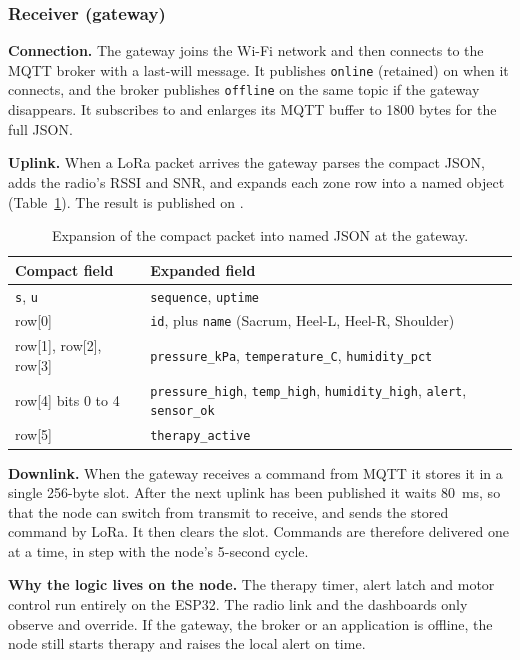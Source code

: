 \subsubsection{Receiver (gateway)}
\textbf{Connection.} The gateway joins the Wi-Fi network and then connects to the MQTT broker with a last-will message. It publishes \texttt{online} (retained) on  when it connects, and the broker publishes \texttt{offline} on the same topic if the gateway disappears. It subscribes to  and enlarges its MQTT buffer to 1800 bytes for the full JSON.

\textbf{Uplink.} When a LoRa packet arrives the gateway parses the compact JSON, adds the radio's RSSI and SNR, and expands each zone row into a named object (Table~\ref{tab:expand}). The result is published on .

{\small{}
\begin{table}[H]
\centering
\begin{tabular}{@{}ll@{}}
\toprule
\textbf{Compact field} & \textbf{Expanded field}\\
\midrule
\texttt{s}, \texttt{u} & \texttt{sequence}, \texttt{uptime}\\
row[0] & \texttt{id}, plus \texttt{name} (Sacrum, Heel-L, Heel-R, Shoulder)\\
row[1], row[2], row[3] & \texttt{pressure\_kPa}, \texttt{temperature\_C}, \texttt{humidity\_pct}\\
row[4] bits 0 to 4 & \texttt{pressure\_high}, \texttt{temp\_high}, \texttt{humidity\_high}, \texttt{alert}, \texttt{sensor\_ok}\\
row[5] & \texttt{therapy\_active}\\
\bottomrule
\end{tabular}
\caption{Expansion of the compact packet into named JSON at the gateway.}
\label{tab:expand}
\end{table}}

\textbf{Downlink.} When the gateway receives a command from MQTT it stores it in a single 256-byte slot. After the next uplink has been published it waits 80~ms, so that the node can switch from transmit to receive, and sends the stored command by LoRa. It then clears the slot. Commands are therefore delivered one at a time, in step with the node's 5-second cycle.

\textbf{Why the logic lives on the node.} The therapy timer, alert latch and motor control run entirely on the ESP32. The radio link and the dashboards only observe and override. If the gateway, the broker or an application is offline, the node still starts therapy and raises the local alert on time.

